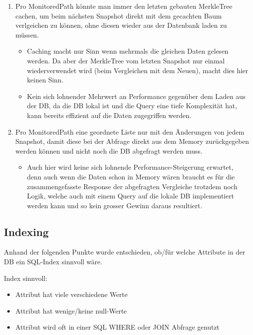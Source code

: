 \documentclass[a4paper,12pt]{report}
\begin{document}
    \begin{enumerate}
        \item Pro MonitoredPath könnte man immer den letzten gebauten MerkleTree cachen, um beim nächsten Snapshot
        direkt mit dem gecachten Baum verlgeichen zu können, ohne diesen wieder aus der Datenbank laden zu müssen.
        \begin{itemize}
            \item Caching macht nur Sinn wenn mehrmals die gleichen Daten gelesen werden.
            Da aber der MerkleTree vom letzten Snapshot nur einmal wiederverwendet wird (beim Vergleichen mit dem Neuen), macht dies hier keinen Sinn.
            \item Kein sich lohnender Mehrwert an Performance gegenüber dem Laden aus der DB, da die DB lokal ist und die Query
            eine tiefe Komplexität hat, kann bereits effizient auf die Daten zugegriffen werden.
        \end{itemize}
        \item Pro MonitoredPath eine geordnete Liste nur mit den Änderungen von jedem Snapshot, damit diese bei der Abfrage
        direkt aus dem Memory zurückgegeben werden können und nicht noch die DB abgefragt werden muss.
        \begin{itemize}
            \item Auch hier wird keine sich lohnende Performance-Steigerung erwartet, denn auch wenn die Daten schon in Memory wären
            braucht es für die zusammengefasste Response der abgefragten Vergleiche trotzdem noch Logik,
            welche auch mit einem Query auf die lokale DB implementiert werden kann und so kein grosser Gewinn daraus resultiert.
        \end{itemize}
    \end{enumerate}

    \subsection{Indexing}
    Anhand der folgenden Punkte wurde entschieden, ob/für welche Attribute in der DB ein SQL-Index sinnvoll wäre.

    Index sinnvoll:
    \begin{itemize}
        \item Attribut hat viele verschiedene Werte
        \item Attribut hat wenige/keine null-Werte
        \item Attribut wird oft in einer SQL WHERE oder JOIN Abfrage genutzt
    \end{itemize}
\end{document}
